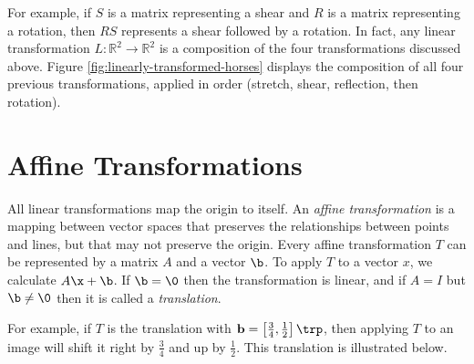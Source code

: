 For example, if $S$ is a matrix representing a shear and $R$ is a matrix representing a rotation, then $RS$ represents a shear followed by a rotation.
In fact, any linear transformation $L:\mathbb{R}^2 \rightarrow\mathbb{R}^2$ is a composition of the four transformations discussed above.
Figure \ref{fig:linearly-transformed-horses} displays the composition of all four previous transformations, applied in order (stretch, shear, reflection, then rotation).

\section*{Affine Transformations} %

All linear transformations map the origin to itself.
An \emph{affine transformation} is a mapping between vector spaces that preserves the relationships between points and lines, but that may not preserve the origin.
Every affine transformation $T$ can be represented by a matrix $A$ and a vector $\b$.
To apply $T$ to a vector $x$, we calculate $A\x + \b$.
If $\b = \0$ then the transformation is linear, and if $A = I$ but $\b\neq\0$ then it is called a \emph{translation}.

For example, if $T$ is the translation with $\mathbf{b} = \left[\frac{3}{4}, \frac{1}{2}\right]\trp$, then applying $T$ to an image will shift it right by $\frac{3}{4}$ and up by $\frac{1}{2}$.
This translation is illustrated below.


